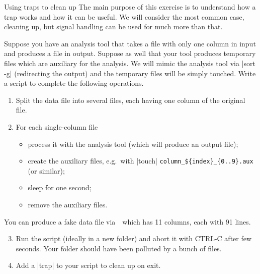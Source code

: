 
\begin{exercise}[Inspirational]{Using traps to clean up}
    The main purpose of this exercise is to understand how a trap works and how it can be useful.
    We will consider the most common case, cleaning up, but signal handling can be used for much more than that.
    
    Suppose you have an analysis tool that takes a file with only one column in input and produces a file in output.
    Suppose as well that your tool produces temporary files which are auxiliary for the analysis.
    We will mimic the analysis tool via \bash|sort -g| (redirecting the output) and the temporary files will be simply touched.
    Write a script to complete the following operations.
    \begin{enumerate}
        \item Split the data file into several files, each having one column of the original file.
        \item For each single-column file
              \begin{itemize}
                  \item process it with the analysis tool (which will produce an output file);
                  \item create the auxiliary files, e.g.\ with \bash|touch| \texttt{column\_\$\{index\}\_\{0..9\}.aux} (or similar);
                  \item sleep for one second;
                  \item remove the auxiliary files.
              \end{itemize}
    \end{enumerate}
    You can produce a fake data file via \,\, which has 11 columns, each with 91 lines.
    \begin{enumerate}
        \setcounter{enumi}{2}
        \item Run the script (ideally in a new folder) and abort it with CTRL-C after few seconds.
              Your folder should have been polluted by a bunch of files.
        \item Add a \bash|trap| to your script to clean up on exit.
    \end{enumerate}
\end{exercise}